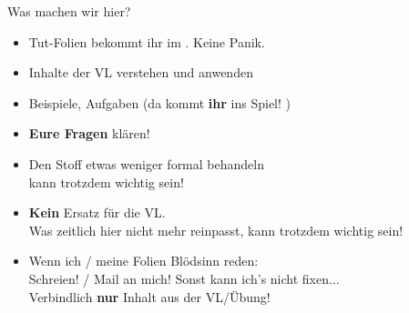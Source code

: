 	
\begin{frame}{Was machen wir hier?}  %
	\begin{overlayarea}{\textwidth}{.60\textwidth}
		\begin{itemize}
			\item Tut-Folien bekommt ihr im \ILIAS. Keine Panik.  
			\pause
			\item Inhalte der VL verstehen und anwenden
			\item Beispiele, Aufgaben (da kommt \textbf{ihr} ins Spiel! \smiley)
			\item \textbf{Eure Fragen} klären!    
			\pause
			\item Den Stoff etwas weniger formal behandeln \\ 
			\impl {} kann trotzdem wichtig sein! 
			\item \textbf{Kein} Ersatz für die VL. \\
			Was zeitlich hier nicht mehr reinpasst, kann trotzdem wichtig sein!
			\item Wenn ich / meine Folien Blödsinn reden: \\
			Schreien! / Mail an mich! \impl Sonst kann ich's nicht fixen... \frownie \\
			Verbindlich \textbf{nur} Inhalt aus der VL/Übung! 
			

\end{itemize}
\end{overlayarea}
\end{frame}
